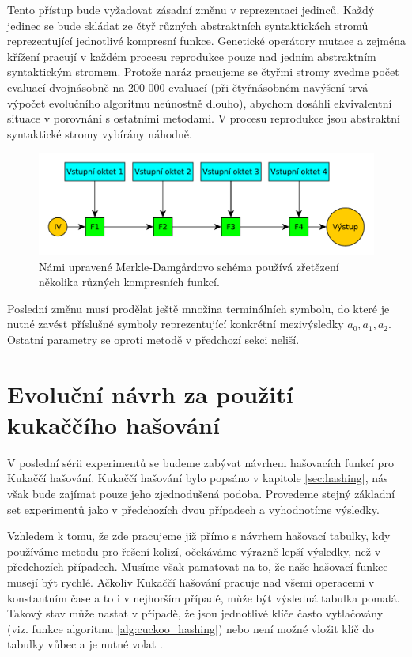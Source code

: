 Tento přístup bude vyžadovat zásadní změnu v reprezentaci jedinců. Každý jedinec se bude skládat ze čtyř 
různých abstraktních syntaktickách stromů reprezentující jednotlivé kompresní funkce. Genetické operátory
mutace a zejména křížení pracují v každém procesu reprodukce pouze nad jedním abstraktním
syntaktickým stromem. Protože naráz pracujeme se čtyřmi stromy zvedme počet evaluací dvojnásobně na
200 000 evaluací (při čtyřnásobném navýšení trvá výpočet evolučního algoritmu neúnostně dlouho),
abychom dosáhli ekvivalentní situace v porovnání s ostatními metodami. V procesu reprodukce jsou abstraktní
syntaktické stromy vybírány náhodně. 

\begin{figure}[!ht]
	\includegraphics[width=\textwidth]{fig/merkle_damgard_design2}
	\caption{Námi upravené Merkle-Damg\r{a}rdovo schéma používá zřetězení několika různých kompresních funkcí.}
\end{figure}

Poslední změnu musí prodělat ještě množina terminálních symbolu, do které je nutné zavést příslušné symboly reprezentující
konkrétní mezivýsledky $a_0, a_1, a_2$. Ostatní parametry se oproti metodě v předchozí sekci neliší.

\section{Evoluční návrh za použití kukaččího hašování}

V poslední sérii experimentů se budeme zabývat návrhem hašovacích funkcí pro Kukaččí hašování.
Kukaččí hašování bylo popsáno v kapitole \ref{sec:hashing}, nás však bude zajímat pouze jeho
zjednodušená podoba. Provedeme stejný základní set experimentů jako v předchozích dvou případech
a vyhodnotíme výsledky.

Vzhledem k tomu, že zde pracujeme již přímo s návrhem hašovací tabulky, kdy používáme metodu pro
řešení kolizí, očekáváme výrazně lepší výsledky, než v předchozích případech. Musíme však pamatovat
na to, že naše hašovací funkce musejí být rychlé. Ačkoliv Kukaččí hašování pracuje nad všemi
operacemi v konstantním čase a to i v nejhorším případě, může být výsledná tabulka pomalá. Takový
stav může nastat v případě, že jsou jednotlivé klíče často vytlačovány (viz. funkce 
algoritmu \ref{alg:cuckoo_hashing}) nebo není možné vložit klíč do tabulky vůbec a je nutné
volat . 

